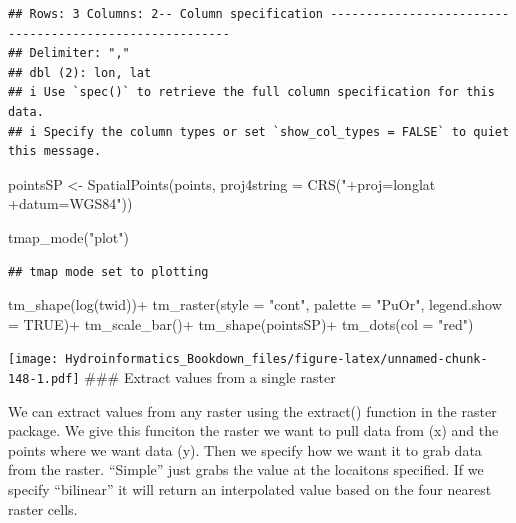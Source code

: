 \documentclass[
]{book}
\newenvironment{Shaded}{\begin{snugshade}}{\end{snugshade}}
\newcommand{\AttributeTok}[1]{\textcolor[rgb]{0.77,0.63,0.00}{#1}}
\newcommand{\ConstantTok}[1]{\textcolor[rgb]{0.00,0.00,0.00}{#1}}
\newcommand{\FunctionTok}[1]{\textcolor[rgb]{0.00,0.00,0.00}{#1}}
\newcommand{\NormalTok}[1]{#1}
\newcommand{\OtherTok}[1]{\textcolor[rgb]{0.56,0.35,0.01}{#1}}
\newcommand{\SpecialCharTok}[1]{\textcolor[rgb]{0.00,0.00,0.00}{#1}}
\newcommand{\StringTok}[1]{\textcolor[rgb]{0.31,0.60,0.02}{#1}}
\begin{document}
\begin{verbatim}
## Rows: 3 Columns: 2-- Column specification --------------------------------------------------------
## Delimiter: ","
## dbl (2): lon, lat
## i Use `spec()` to retrieve the full column specification for this data.
## i Specify the column types or set `show_col_types = FALSE` to quiet this message.
\end{verbatim}

\begin{Shaded}
\begin{Highlighting}[]
\NormalTok{pointsSP }\OtherTok{\textless{}{-}} \FunctionTok{SpatialPoints}\NormalTok{(points, }\AttributeTok{proj4string =} \FunctionTok{CRS}\NormalTok{(}\StringTok{"+proj=longlat +datum=WGS84"}\NormalTok{))}

\FunctionTok{tmap\_mode}\NormalTok{(}\StringTok{"plot"}\NormalTok{)}
\end{Highlighting}
\end{Shaded}

\begin{verbatim}
## tmap mode set to plotting
\end{verbatim}

\begin{Shaded}
\begin{Highlighting}[]
\FunctionTok{tm\_shape}\NormalTok{(}\FunctionTok{log}\NormalTok{(twid))}\SpecialCharTok{+}
  \FunctionTok{tm\_raster}\NormalTok{(}\AttributeTok{style =} \StringTok{"cont"}\NormalTok{, }\AttributeTok{palette =} \StringTok{"PuOr"}\NormalTok{, }\AttributeTok{legend.show =} \ConstantTok{TRUE}\NormalTok{)}\SpecialCharTok{+}
  \FunctionTok{tm\_scale\_bar}\NormalTok{()}\SpecialCharTok{+}
\FunctionTok{tm\_shape}\NormalTok{(pointsSP)}\SpecialCharTok{+}
  \FunctionTok{tm\_dots}\NormalTok{(}\AttributeTok{col =} \StringTok{"red"}\NormalTok{)}
\end{Highlighting}
\end{Shaded}

\texttt{[image: Hydroinformatics\_Bookdown\_files/figure-latex/unnamed-chunk-148-1.pdf]}
\#\#\# Extract values from a single raster

We can extract values from any raster using the extract() function in the raster package. We give this funciton the raster we want to pull data from (x) and the points where we want data (y). Then we specify how we want it to grab data from the raster. ``Simple'' just grabs the value at the locaitons specified. If we specify ``bilinear'' it will return an interpolated value based on the four nearest raster cells.
\end{document}
